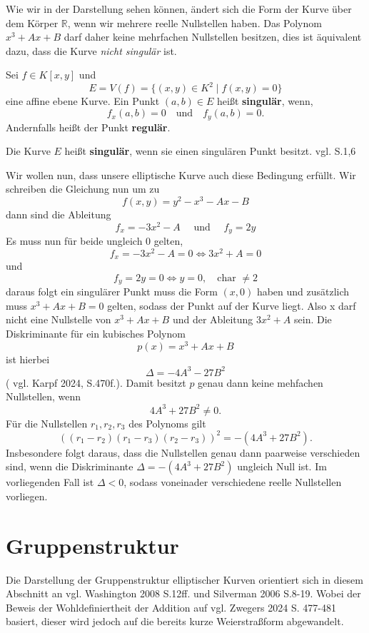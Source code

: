 Wie wir in der Darstellung sehen können, ändert sich die Form der Kurve über dem Körper $\mathbb{R}$, wenn wir mehrere reelle Nullstellen haben. Das Polynom \(x^3+Ax+B\) darf daher keine mehrfachen Nullstellen besitzen, dies ist äquivalent dazu, dass die Kurve \emph{nicht singulär} ist.

\begin{definition}
    Sei $f \in K[x,y]$ und
    \[
        E = V(f) = \{(x,y)\in K^2 \mid f(x,y)=0\}
    \]
    eine affine ebene Kurve. Ein Punkt \((a,b)\in E\) heißt \textbf{singulär}, wenn,
    \[
        f_x(a,b)=0 \quad \text{und}\quad f_y(a,b)=0.
    \]
    Andernfalls heißt der Punkt \textbf{regulär}.

    Die Kurve \(E\) heißt \textbf{singulär}, wenn sie einen singulären Punkt besitzt.
    vgl. \cite{plaumann20} S.1,6
\end{definition}

Wir wollen nun, dass unsere elliptische Kurve auch diese Bedingung erfüllt.
Wir schreiben die Gleichung nun um zu
\[
    f(x,y)=y^2-x^3-Ax-B
\]
dann sind die Ableitung
\[
    f_x= -3x^2-A \quad \text{ und } \quad f_y=2y
\]
Es muss nun für beide ungleich 0 gelten,
\[
    f_x= -3x^2-A = 0 \Leftrightarrow 3x^2+A = 0
\]
und
\[
    f_y=2y = 0 \Leftrightarrow y = 0, \quad \text{char }\neq 2
\]
daraus folgt ein singulärer Punkt muss die Form $(x,0)$ haben und zusätzlich muss \(x^3+Ax+B = 0\) gelten, sodass der Punkt auf der Kurve liegt.
Also x darf nicht eine Nullstelle von \(x^3+Ax+B\) und der Ableitung \(3x^2+A\) sein.
Die Diskriminante für ein kubisches Polynom
\[
    p(x)=x^3+Ax+B
\]
ist hierbei
\[
    \Delta  = -4A^3-27B^2
\]
(\cite{karpf24} vgl. Karpf 2024, S.470f.).
Damit besitzt $p$ genau dann keine mehfachen Nullstellen, wenn
\[
    4A^3+27B^2 \neq 0.
\]
Für die Nullstellen $r_1, r_2, r_3$ des Polynoms gilt
\[
    ((r_1 - r_2)(r_1 - r_3)(r_2 - r_3))^2 = -(4A^3 + 27B^2).
\]
Insbesondere folgt daraus, dass die Nullstellen genau dann paarweise verschieden sind, wenn die Diskriminante $\Delta = -(4A^3 + 27B^2)$ ungleich Null ist.
Im vorliegenden Fall ist $\Delta < 0$, sodass voneinader verschiedene reelle Nullstellen vorliegen.


\section{Gruppenstruktur}

Die Darstellung der Gruppenstruktur elliptischer Kurven orientiert sich in diesem Abschnitt an \cite{washington08} vgl. Washington 2008 S.12ff. und \cite{silverman06} Silverman 2006 S.8-19. Wobei der Beweis der Wohldefiniertheit der Addition auf \cite{zwegers24} vgl. Zwegers 2024 S. 477-481 basiert, dieser wird jedoch auf die bereits kurze Weierstraßform abgewandelt.

